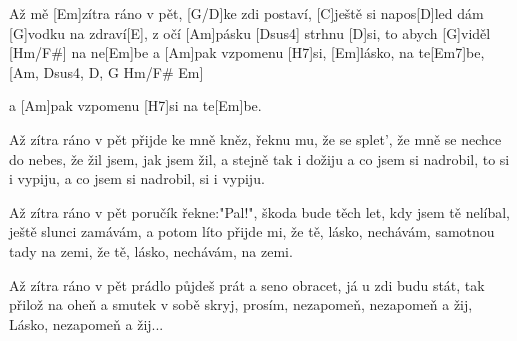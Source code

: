 
Až mě [Em]zítra ráno v pět,
[G/D]ke zdi postaví,
[C]ještě si napos[D]led
dám [G]vodku na zdraví[E],
z očí [Am]pásku [Dsus4] strhnu [D]si,
to abych [G]viděl [Hm/F#] na ne[Em]be
a [Am]pak vzpomenu [H7]si,
[Em]lásko, na te[Em7]be,
[Am, Dsus4, D, G Hm/F# Em] 

a [Am]pak vzpomenu [H7]si na te[Em]be.\slpc

Až zítra ráno v pět přijde ke mně kněz,
řeknu mu, že se splet', že mně se nechce do nebes,
že žil jsem, jak jsem žil, a stejně tak i dožiju
a co jsem si nadrobil, to si i vypiju,
a co jsem si nadrobil, si i vypiju.

Až zítra ráno v pět poručík řekne:"Pal!",
škoda bude těch let, kdy jsem tě nelíbal,
ještě slunci zamávám, a potom líto přijde mi,
že tě, lásko, nechávám, samotnou tady na zemi,
že tě, lásko, nechávám, na zemi.

Až zítra ráno v pět prádlo půjdeš prát
a seno obracet, já u zdi budu stát,
tak přilož na oheň a smutek v sobě skryj,
prosím, nezapomeň, nezapomeň a žij,
Lásko, nezapomeň a žij...

